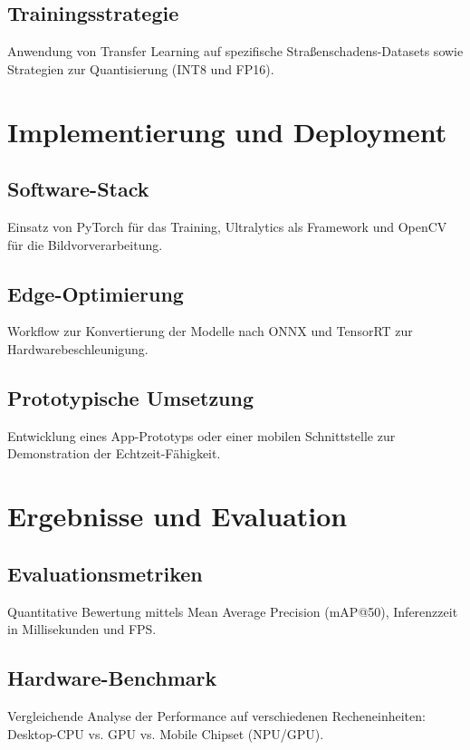 \documentclass[fontsize=13pt,a4paper, listof=entryprefix, bibliography=totocnumbered,toc=listofnumbered]{scrartcl}
\begin{document}
\subsection{Trainingsstrategie}
Anwendung von Transfer Learning auf spezifische Straßenschadens-Datasets sowie Strategien zur Quantisierung (INT8 und FP16).

\section{Implementierung und Deployment}
\label{sec:implementierung}

\subsection{Software-Stack}
Einsatz von PyTorch für das Training, Ultralytics als Framework und OpenCV für die Bildvorverarbeitung.

\subsection{Edge-Optimierung}
Workflow zur Konvertierung der Modelle nach ONNX und TensorRT zur Hardwarebeschleunigung.

\subsection{Prototypische Umsetzung}
Entwicklung eines App-Prototyps oder einer mobilen Schnittstelle zur Demonstration der Echtzeit-Fähigkeit.

\section{Ergebnisse und Evaluation}
\label{sec:evaluation}

\subsection{Evaluationsmetriken}
Quantitative Bewertung mittels Mean Average Precision (mAP@50), Inferenzzeit in Millisekunden und FPS.

\subsection{Hardware-Benchmark}
Vergleichende Analyse der Performance auf verschiedenen Recheneinheiten: Desktop-CPU vs. GPU vs. Mobile Chipset (NPU/GPU).
\end{document}
